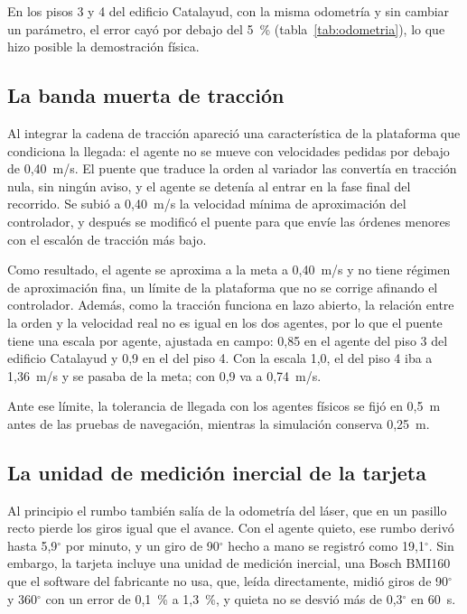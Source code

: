 En los pisos 3 y 4 del edificio Catalayud, con la misma odometría y sin cambiar un parámetro, el error cayó por debajo del 5~\%
(tabla~\ref{tab:odometria}), lo que hizo posible la demostración física.

\subsection{La banda muerta de tracción}
\label{sec:banda-muerta}

Al integrar la cadena de tracción apareció una característica de la plataforma que condiciona la llegada: el agente no se mueve con velocidades pedidas por debajo de 0,40~m/s. El puente que
traduce la orden al variador las convertía en tracción nula, sin ningún aviso, y el agente se detenía al entrar en la fase final del recorrido. Se subió a 0,40~m/s la velocidad
mínima de aproximación del controlador, y después se modificó el puente para que envíe las órdenes menores con el escalón de tracción más bajo.

Como resultado, el agente se aproxima a la meta a 0,40~m/s y no tiene régimen de aproximación fina, un límite de la plataforma que no se corrige afinando el controlador. Además, como la
tracción funciona en lazo abierto, la relación entre la orden y la velocidad real no es igual en los dos agentes, por lo que el puente tiene una escala por agente, ajustada en campo: 0,85
en el agente del piso 3 del edificio Catalayud y 0,9 en el del piso 4. Con la escala 1,0, el del piso 4 iba a 1,36~m/s y se pasaba de la meta; con 0,9 va a 0,74~m/s.

Ante ese límite, la tolerancia de llegada con los agentes físicos se fijó en 0,5~m antes de las pruebas de navegación, mientras la simulación conserva 0,25~m.

\subsection{La unidad de medición inercial de la tarjeta}
\label{sec:imu}

Al principio el rumbo también salía de la odometría del láser, que en un pasillo recto pierde los giros igual que el avance. Con el agente quieto, ese rumbo derivó hasta 5,9$^\circ$ por minuto,
y un giro de 90$^\circ$ hecho a mano se registró como 19,1$^\circ$. Sin embargo, la tarjeta incluye una unidad de medición inercial, una Bosch BMI160 que el software del fabricante no usa, que,
leída directamente, midió giros de 90$^\circ$ y 360$^\circ$ con un error de 0,1~\% a 1,3~\%, y quieta no se desvió más de 0,3$^\circ$ en 60~s.

